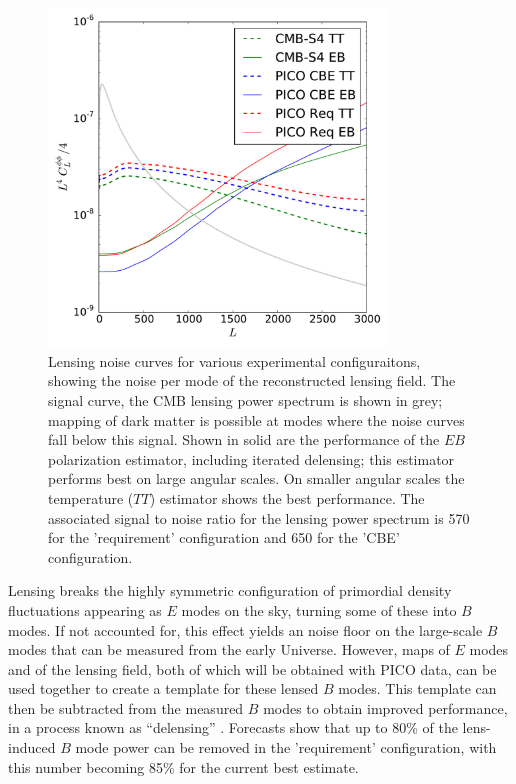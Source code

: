 \documentclass[PICOReport.tex]{subfiles}
\begin{document}
\begin{figure}
\includegraphics[width=0.8\textwidth]{images/lensingNoisePICO.pdf}
\caption{\label{fig:lensingNoisePICO} Lensing noise curves for various experimental configuraitons, showing the noise per mode of the reconstructed lensing field.  The  signal curve, the CMB lensing power spectrum is shown in grey; mapping of dark matter is possible at modes  where the noise curves fall below this signal.  Shown in solid are the performance of the $EB$ polarization estimator, including iterated delensing; this estimator performs best on large angular scales.  On smaller angular scales the temperature ($TT$) estimator shows the best performance. The associated signal to noise ratio for the lensing power spectrum is 570 for the 'requirement' configuration and 650 for the 'CBE'  configuration.}
\end{figure}


Lensing breaks the highly symmetric configuration of  primordial density fluctuations appearing as $E$ modes on the sky, turning some of these into $B$ modes.  If not accounted for, this effect yields an  noise floor on the large-scale $B$ modes that can be measured from the early Universe.  However, maps of $E$ modes and of the lensing field, both of which will be obtained with PICO data, can be used together to create a template for these lensed $B$ modes.  This template can then be subtracted from the measured $B$ modes to obtain improved performance, in a process known as ``delensing'' \citep{2004PhRvD..69d3005S,2012JCAP...06..014S}.  Forecasts show that up to 80\% of the lens-induced $B$ mode power can be removed in the 'requirement' configuration, with this number becoming 85\% for the current best estimate.  
\end{document}
